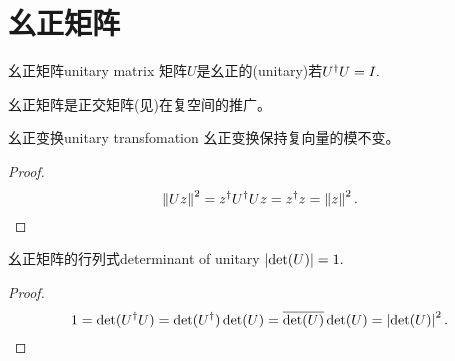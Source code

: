 \section{幺正矩阵}
\begin{definition}{幺正矩阵}{unitary matrix}
	矩阵$U$是幺正的(unitary)若$U^\dagger U=I.$
\end{definition}
幺正矩阵是正交矩阵(见)在复空间的推广。
\begin{theorem}{幺正变换}{unitary transfomation}
	幺正变换保持复向量的模不变。
\end{theorem}
\begin{proof}
	\[
		\left\lVert Uz\right\rVert^2=z^\dagger U^\dagger Uz=z^\dagger z=\left\lVert z\right\rVert^2.
		\qedhere
	\]
\end{proof}
\begin{theorem}{幺正矩阵的行列式}{determinant of unitary}
	$\left\lvert\det(U)\right\rvert=1.$
\end{theorem}
\begin{proof}
	\[
		1=\det(U^\dagger U)=\det(U^\dagger)\det(U)=\overline{\det(U)}\det(U)=\left\lvert\det(U)\right\rvert^2.
		\qedhere
	\]
\end{proof}
